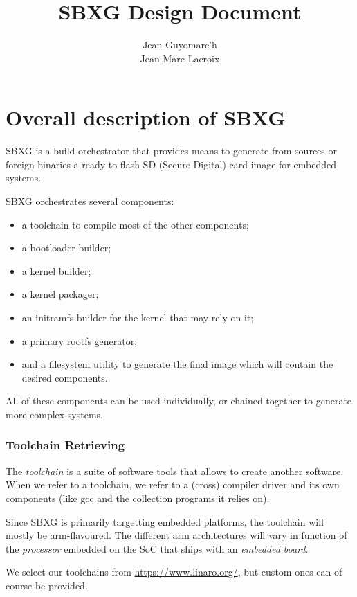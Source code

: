 \documentclass{article}
\title{SBXG Design Document}
\date{}
\author{%
  Jean Guyomarc'h%
  \\Jean-Marc Lacroix%
}
\begin{document}
\maketitle
\tableofcontents
\clearpage

\part{Overall description of SBXG}

SBXG is a build orchestrator that provides means to generate from sources or
foreign binaries a ready-to-flash SD (Secure Digital) card image for embedded systems.

SBXG orchestrates several components:
\begin{itemize}
\item a toolchain to compile most of the other components;
\item a bootloader builder;
\item a kernel builder;
\item a kernel packager;
\item an initramfs builder for the kernel that may rely on it;
\item a primary rootfs generator;
\item and a filesystem utility to generate the final image which will contain the
  desired components.
\end{itemize}

All of these components can be used individually, or chained together to
generate more complex systems.



\section{Toolchain Retrieving}

The \emph{toolchain} is a suite of software tools that allows to create another
software. When we refer to a toolchain, we refer to a (cross) compiler driver
and its own components (like gcc and the collection programs it relies on).

Since SBXG is primarily targetting embedded platforms, the toolchain will mostly
be arm-flavoured. The different arm architectures will vary in function of the
\emph{processor} embedded on the SoC that ships with an \emph{embedded board}.

We select our toolchains from \url{https://www.linaro.org/}, but custom ones can
of course be provided.
\end{document}
